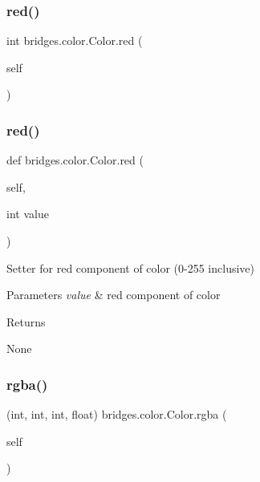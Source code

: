 \subsubsection{\texorpdfstring{red()}{red()}\hspace{0.1cm}{\footnotesize\ttfamily [1/2]}}
{\footnotesize\ttfamily  int bridges.\+color.\+Color.\+red (\begin{DoxyParamCaption}\item[{}]{self }\end{DoxyParamCaption})}

\mbox{\label{classbridges_1_1color_1_1_color_a672c865920fd1810986064ffa54bc9f1}} 
\subsubsection{\texorpdfstring{red()}{red()}\hspace{0.1cm}{\footnotesize\ttfamily [2/2]}}
{\footnotesize\ttfamily def bridges.\+color.\+Color.\+red (\begin{DoxyParamCaption}\item[{}]{self,  }\item[{int}]{value }\end{DoxyParamCaption})}



Setter for red component of color (0-\/255 inclusive) 


\begin{DoxyParams}{Parameters}
{\em value} & red component of color \\
\hline
\end{DoxyParams}
\begin{DoxyReturn}{Returns}


None 
\end{DoxyReturn}
\mbox{\label{classbridges_1_1color_1_1_color_aa0e83c31afdaaf5c33e871bc6bb98121}} 
\subsubsection{\texorpdfstring{rgba()}{rgba()}\hspace{0.1cm}{\footnotesize\ttfamily [1/2]}}
{\footnotesize\ttfamily  (int, int, int, float) bridges.\+color.\+Color.\+rgba (\begin{DoxyParamCaption}\item[{}]{self }\end{DoxyParamCaption})}



